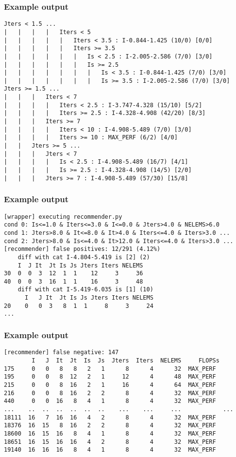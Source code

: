 \documentclass[xcolor=table,hideothersubsections,aspectratio=1610]{beamer}
\begin{document}
\begin{frame}[fragile]
\frametitle{Example output}
\begin{verbatim}
Jters < 1.5 ...
|   |   |   |   Iters < 5
|   |   |   |   |   Iters < 3.5 : I-0.844-1.425 (10/0) [0/0]
|   |   |   |   |   Iters >= 3.5
|   |   |   |   |   |   Is < 2.5 : I-2.005-2.586 (7/0) [3/0]
|   |   |   |   |   |   Is >= 2.5
|   |   |   |   |   |   |   Is < 3.5 : I-0.844-1.425 (7/0) [3/0]
|   |   |   |   |   |   |   Is >= 3.5 : I-2.005-2.586 (7/0) [3/0]
Jters >= 1.5 ...
|   |   |   Iters < 7
|   |   |   |   Iters < 2.5 : I-3.747-4.328 (15/10) [5/2]
|   |   |   |   Iters >= 2.5 : I-4.328-4.908 (42/20) [8/3]
|   |   |   Iters >= 7
|   |   |   |   Iters < 10 : I-4.908-5.489 (7/0) [3/0]
|   |   |   |   Iters >= 10 : MAX_PERF (6/2) [4/0]
|   |   Jters >= 5 ...
|   |   |   Jters < 7
|   |   |   |   Is < 2.5 : I-4.908-5.489 (16/7) [4/1]
|   |   |   |   Is >= 2.5 : I-4.328-4.908 (14/5) [2/0]
|   |   |   Jters >= 7 : I-4.908-5.489 (57/30) [15/8]

\end{verbatim}
\end{frame}

\begin{frame}[fragile]
\frametitle{Example output}
\begin{verbatim}
[wrapper] executing recommender.py
cond 0: Is<=1.0 & Iters<=3.0 & I<=0.0 & Jters>4.0 & NELEMS>6.0 
cond 1: Jters>8.0 & It<=8.0 & It>4.0 & Iters<=4.0 & Iters>3.0 ...
cond 2: Jters>8.0 & Is<=4.0 & It>12.0 & Iters<=4.0 & Iters>3.0 ...
[recommender] false positives: 12/291 (4.12%)
	diff with cat I-4.804-5.419 is [2] (2)
    I  J It  Jt Is Js Jters Iters NELEMS
30  0  0  3  12  1  1    12     3     36
40  0  0  3  16  1  1    16     3     48
	diff with cat I-5.419-6.035 is [1] (10)
      I   J It  Jt Is Js Jters Iters NELEMS
20    0   0  3   8  1  1     8     3     24
...

\end{verbatim}
\end{frame}

\begin{frame}[fragile]
\frametitle{Example output}
\begin{verbatim}
[recommender] false negative: 147 
        I   J  It  Jt  Is  Js  Jters  Iters  NELEMS     FLOPSs
175     0   0   8   8   2   1      8      4      32  MAX_PERF
195     0   0   8  12   2   1     12      4      48  MAX_PERF
215     0   0   8  16   2   1     16      4      64  MAX_PERF
216     0   0   8  16   2   2      8      4      32  MAX_PERF
440     0   0  16   8   4   1      8      4      32  MAX_PERF
...    ..  ..  ..  ..  ..  ..    ...    ...     ...            ...
18111  16   7  16  16   4   2      8      4      32  MAX_PERF
18376  16  15   8  16   2   2      8      4      32  MAX_PERF
18600  16  15  16   8   4   1      8      4      32  MAX_PERF
18651  16  15  16  16   4   2      8      4      32  MAX_PERF
19140  16  16  16   8   4   1      8      4      32  MAX_PERF


\end{verbatim}
\end{frame}
\end{document}
